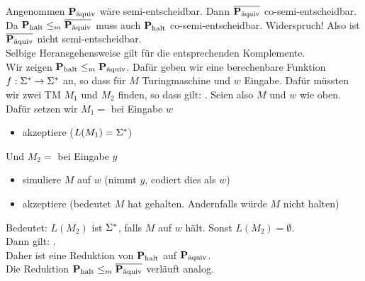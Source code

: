     \LOES Angenommen $\paq$ wäre semi-entscheidbar. Dann $\overline{\paq}$ co-semi-entscheidbar. \\ Da $\phalt \leq_{m} \overline{\paq}$ muss auch $\phalt$ co-semi-entscheidbar. Widerspruch! Also ist $\overline{\paq}$ nicht semi-entscheidbar. \\
    Selbige Heransgehensweise gilt für die entsprechenden Komplemente. \\

    Wir zeigen $\phalt \leq_{m} \paq$. Dafür geben wir eine berechenbare Funktion $f: \SIGS \to \SIGS$ an, so dass  für $M$ Turingmaschine und $w$ Eingabe.
    Dafür müssten wir zwei TM $M_{1}$ und $M_{2}$ finden, so dass gilt: .
    Seien also $M$ und $w$ wie oben. \\

    Dafür setzen wir $M_{1} =$ bei Eingabe $w$
    \begin{itemize}
        \item akzeptiere ($L(M_{1}) = \SIGS$)
    \end{itemize}
    Und $M_{2} = $ bei Eingabe $y$
    \begin{itemize}
        \item simuliere $M$ auf $w$ (nimmt $y$, codiert dies als $w$)
        \item akzeptiere (bedeutet $M$ hat gehalten. Andernfalls würde $M$ nicht halten)
    \end{itemize}
    Bedeutet: $L(M_{2})$ ist $\SIGS$, falls $M$ auf $w$ hält. Sonst $L(M_{2}) = \emptyset$. \\
    Dann gilt: . \\
    Daher ist  eine Reduktion von $\phalt$ auf $\paq$. \\
    Die Reduktion $\phalt \leq_{m} \overline{\paq}$ verläuft analog.
